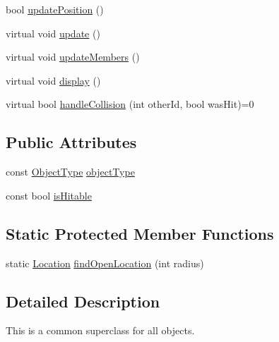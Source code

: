 \begin{DoxyCompactItemize}
\item 
bool \hyperlink{classPhysicalObject_a5e2b241c127b7114693736f89cafc9fb}{update\-Position} ()
\item 
virtual void \hyperlink{classPhysicalObject_a3005ac0afce838049101db17525f6004}{update} ()
\item 
virtual void \hyperlink{classPhysicalObject_a4fc8c0c62b8e12a63ebdf13136d577ac}{update\-Members} ()
\item 
virtual void \hyperlink{classPhysicalObject_a6a0326df3efc0a1ea23892e3fcd4b11e}{display} ()
\item 
virtual bool \hyperlink{classPhysicalObject_a400ba3545479ebbf8b1b4a046906e562}{handle\-Collision} (int other\-Id, bool was\-Hit)=0
\end{DoxyCompactItemize}
\subsection*{Public Attributes}
\begin{DoxyCompactItemize}
\item 
const \hyperlink{PhysicalObject_8h_a842c5e2e69277690b064bf363c017980}{Object\-Type} \hyperlink{classPhysicalObject_a59060233e54004b24fc03ed786b46dd3}{object\-Type}
\item 
const bool \hyperlink{classPhysicalObject_a5afc803dac6415f86fcda81983b75e41}{is\-Hitable}
\end{DoxyCompactItemize}
\subsection*{Static Protected Member Functions}
\begin{DoxyCompactItemize}
\item 
static \hyperlink{structLocation}{Location} \hyperlink{classPhysicalObject_ae184c1c797f3dd8786ca266019a6f283}{find\-Open\-Location} (int radius)
\end{DoxyCompactItemize}


\subsection{Detailed Description}
This is a common superclass for all objects. 


